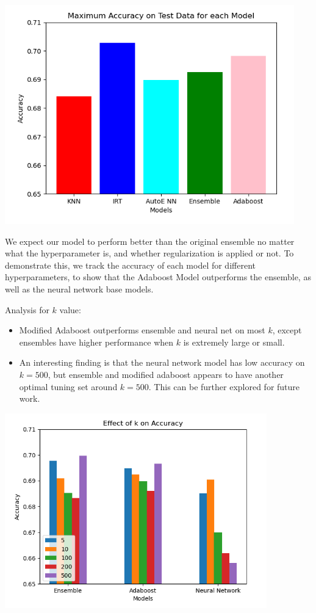 \documentclass{article}
\begin{document}
    \includegraphics[scale=0.7]{figures/pb_f4.png}

    We expect our model to perform better than the original ensemble no matter what the hyperparameter is, and whether regularization is applied or not. To demonstrate this, we track the accuracy of each model for different hyperparameters, to show that the Adaboost Model outperforms the ensemble, as well as the neural network base models.

    Analysis for $k$ value:
    \begin{itemize}
        \item Modified Adaboost outperforms ensemble and neural net on most $k$, except ensembles have higher performance when $k$ is extremely large or small.
        \item An interesting finding is that the neural network model has low accuracy on $k=500$, but ensemble and modified adaboost appears to have another optimal tuning set around $k=500$. This can be further explored for future work.
    \end{itemize}

    \includegraphics[scale=0.7]{figures/pb_f5.png}
\end{document}
